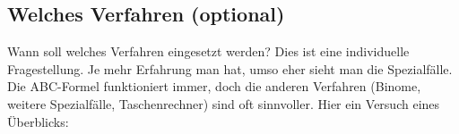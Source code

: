 






\newpage



\TALS{}%
\newpage





\TALS{}

\TALS{}
\GESO{}

\newpage


\TALS{}
\newpage

\subsection{Welches Verfahren (optional)}
Wann soll welches Verfahren eingesetzt werden? Dies ist eine
individuelle Fragestellung. Je mehr Erfahrung man hat, umso eher sieht
man die Spezialfälle. Die ABC-Formel funktioniert immer, doch
die anderen Verfahren (Binome, weitere Spezialfälle, Taschenrechner)
sind oft sinnvoller. Hier ein Versuch eines Überblicks:

